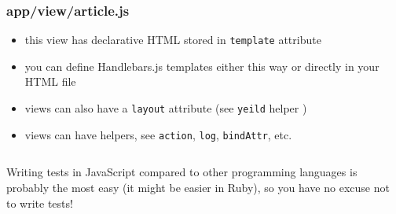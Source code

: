 \documentclass[compress]{beamer}
\begin{document}
\begin{frame}

\frametitle{app/view/article.js}

\begin{itemize}[<+->]
  \item this view has declarative HTML stored in \texttt{template} attribute
  \item you can define Handlebars.js templates either this way or directly in your HTML file
  \item views can also have a \texttt{layout} attribute (see \texttt{yeild} helper )
  \item views can have helpers, see \texttt{action}, \texttt{log}, \texttt{bindAttr}, etc.
\end{itemize}

\inputminted[fontsize=\tiny,gobble=2,linenos=true,firstline=6,lastline=10]{javascript}{code/js/app/view/article.js}

\end{frame}

\begin{frame}
  \begin{center}
  \huge Writing tests in JavaScript compared to other programming languages is probably the most easy
    (it might be easier in Ruby), so you have no excuse not to write tests!
  \end{center}
\end{frame}
\end{document}
